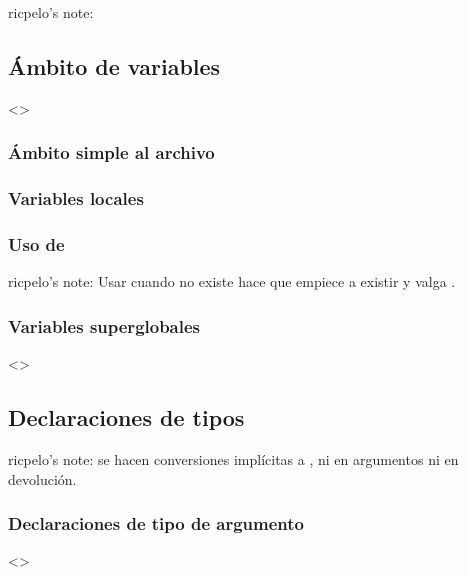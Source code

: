 \documentclass[a4paper,12pt,spanish]{sphinxmanual}
\begin{document}
ricpelo’s note:


\subsection{Ámbito de variables}
\label{\detokenize{php:ambito-de-variables}}
\textless{}\textgreater{}


\subsubsection{Ámbito simple al archivo}
\label{\detokenize{php:ambito-simple-al-archivo}}

\subsubsection{Variables locales}
\label{\detokenize{php:variables-locales}}

\subsubsection{Uso de }
\label{\detokenize{php:uso-de-global}}
ricpelo’s note: Usar  cuando  no existe hace que
 empiece a existir y valga .


\subsubsection{Variables superglobales}
\label{\detokenize{php:variables-superglobales}}
\textless{}\textgreater{}


\subsection{Declaraciones de tipos}
\label{\detokenize{php:declaraciones-de-tipos}}
ricpelo’s note:  se hacen conversiones implícitas a , ni
en argumentos ni en devolución.


\subsubsection{Declaraciones de tipo de argumento}
\label{\detokenize{php:declaraciones-de-tipo-de-argumento}}
\textless{}\textgreater{}
\end{document}
